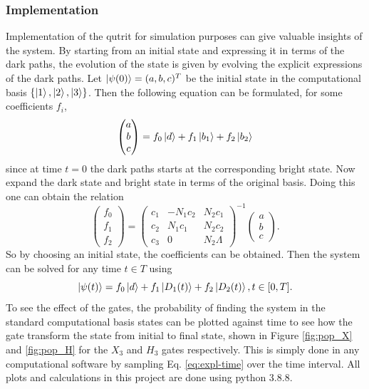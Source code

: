 \subsubsection{Implementation}
Implementation of the qutrit for simulation purposes can give valuable insights of the system. By starting from an initial state and expressing it in terms of the dark paths, the evolution of the state is given by evolving the explicit expressions of the dark paths. Let $\ket{\psi(0)} = (a,b,c)^T$ be the initial state in the computational basis $\{\ket{1},\ket{2},\ket{3}\}$. Then the following equation can be formulated, for some coefficients $f_i$,
\begin{equation}
\begin{pmatrix}
a\\
b\\
c
\end{pmatrix}
= f_0 \ket{d} + f_1\ket{b_1} + f_2\ket{b_2}
\end{equation}
since at time $t = 0$ the dark paths starts at the corresponding bright state.
Now expand the dark state and bright state in terms of the original basis. Doing this one can obtain the relation
\begin{equation}
\begin{pmatrix}
f_0\\
f_1\\
f_2
\end{pmatrix} = \begin{pmatrix}
c_1 & -N_1 c_2 & N_2 c_1
\\
c_2 & N_1 c_1 & N_2 c_2
\\
c_3 & 0 & N_2 \Lambda
\end{pmatrix}^{-1}\begin{pmatrix}
a\\
b\\
c
\end{pmatrix}.
\end{equation}
So by choosing an initial state, the coefficients can be obtained.
Then the system can be solved for any time $t \in T$ using
\begin{equation}
\label{eq:expl-time}
\ket{\psi(t)} = f_0\ket{d} + f_1\ket{D_1(t)} + f_2\ket{D_2(t)}, t \in [0,T].
\end{equation}
To see the effect of the gates, the probability of finding the system in the standard computational basis states can be plotted against time to see how the gate transform the state from initial to final state, shown in Figure \ref{fig:pop_X} and \ref{fig:pop_H} for the $X_3$ and $H_3$ gates respectively. This is simply done in any computational software by sampling Eq. \ref{eq:expl-time} over the time interval. All plots and calculations in this project are done using python 3.8.8.  

